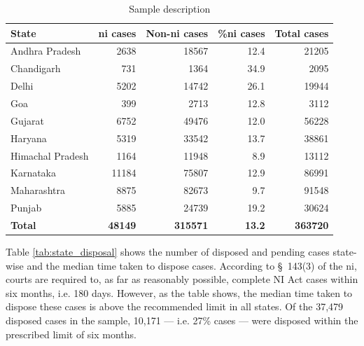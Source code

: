 \documentclass[12pt,a4paper]{article}
\begin{document}
{\footnotesize \begin{longtable}{@{}lrrr|r@{}}
\caption{Sample description}
\label{tab:sample_desc}\\
\toprule
\textbf{State} & \textbf{\gls{ni} cases} & \textbf{Non-\gls{ni} cases} & \textbf{\%\gls{ni} cases} & \textbf{Total cases}\\ \midrule
\endhead
Andhra Pradesh & 2638 & 18567 & 12.4 & 21205\\
Chandigarh & 731 & 1364 & 34.9 & 2095\\
Delhi & 5202 & 14742 & 26.1 & 19944\\
Goa & 399 & 2713 & 12.8 & 3112\\
Gujarat & 6752 & 49476 & 12.0 & 56228\\
Haryana & 5319 & 33542 & 13.7 & 38861\\
Himachal Pradesh & 1164 & 11948 & 8.9 & 13112\\
Karnataka & 11184 & 75807 & 12.9 & 86991\\
Maharashtra & 8875 & 82673 & 9.7 & 91548\\
Punjab & 5885 & 24739 & 19.2 & 30624\\
\midrule
\textbf{Total} & \textbf{48149} & \textbf{315571} & \textbf{13.2} & \textbf{363720}\\ \bottomrule
\end{longtable}
}

Table \ref{tab:state_disposal} shows the number of disposed and pending cases state-wise and the median time taken to dispose cases. According to \S~143(3) of the \gls{ni}, courts are required to, as far as reasonably possible, complete NI Act cases within six months, i.e. 180 days. However, as the table shows, the median time taken to dispose these cases is above the recommended limit in all states. Of the 37,479 disposed cases in the sample, 10,171 --- i.e. 27\% cases --- were disposed within the prescribed limit of six months.
\end{document}

